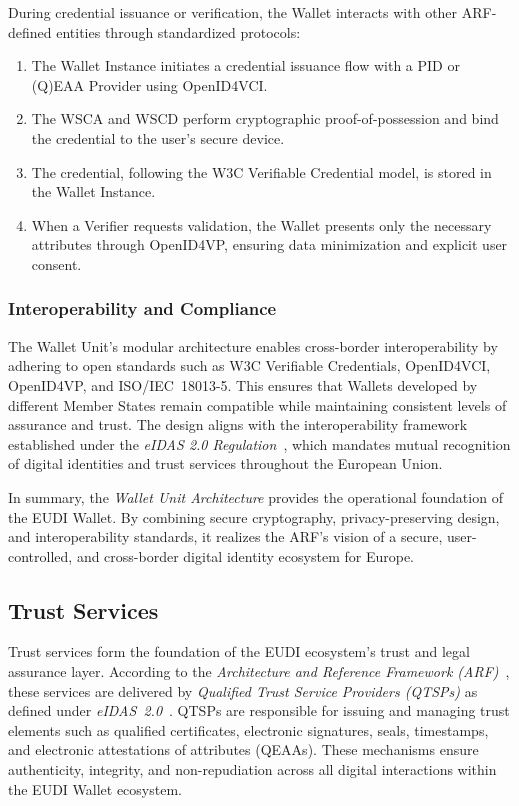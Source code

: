 \documentclass[sigconf,balance,nonacm,authordraft]{acmart}
\begin{document}
During credential issuance or verification, the Wallet interacts with other ARF-defined entities through standardized protocols:

\begin{enumerate}
    \item The Wallet Instance initiates a credential issuance flow with a PID or (Q)EAA Provider using OpenID4VCI.
    \item The WSCA and WSCD perform cryptographic proof-of-possession and bind the credential to the user’s secure device.
    \item The credential, following the W3C Verifiable Credential model, is stored in the Wallet Instance.
    \item When a Verifier requests validation, the Wallet presents only the necessary attributes through OpenID4VP, ensuring data minimization and explicit user consent.
\end{enumerate}

\subsubsection*{Interoperability and Compliance}

The Wallet Unit’s modular architecture enables cross-border interoperability by adhering to open standards such as W3C Verifiable Credentials, OpenID4VCI, OpenID4VP, and ISO/IEC~18013-5. This ensures that Wallets developed by different Member States remain compatible while maintaining consistent levels of assurance and trust. The design aligns with the interoperability framework established under the \textit{eIDAS 2.0 Regulation}~\cite{EU_eIDAS2024}, which mandates mutual recognition of digital identities and trust services throughout the European Union.

In summary, the \textit{Wallet Unit Architecture} provides the operational foundation of the EUDI Wallet. By combining secure cryptography, privacy-preserving design, and interoperability standards, it realizes the ARF’s vision of a secure, user-controlled, and cross-border digital identity ecosystem for Europe.

\subsection{Trust Services}

Trust services form the foundation of the EUDI ecosystem’s trust and legal assurance layer. According to the \textit{Architecture and Reference Framework (ARF)}~\cite{EU_ARF2024}, these services are delivered by \textit{Qualified Trust Service Providers (QTSPs)} as defined under \textit{eIDAS~2.0}~\cite{EU_eIDAS2024}. QTSPs are responsible for issuing and managing trust elements such as qualified certificates, electronic signatures, seals, timestamps, and electronic attestations of attributes (QEAAs). These mechanisms ensure authenticity, integrity, and non-repudiation across all digital interactions within the EUDI Wallet ecosystem.
\end{document}
